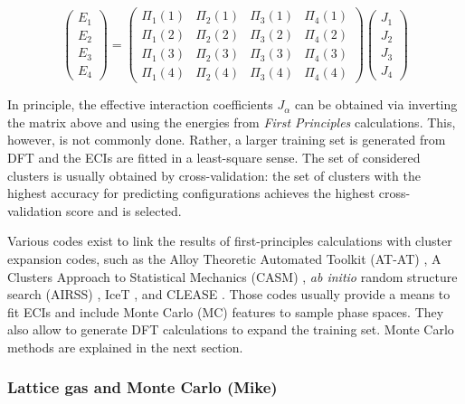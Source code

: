 \documentclass[../main.tex]{subfiles}
\begin{document}
\begin{equation}
{\left( \begin{array}{cccc}
{E_1}\\
{E_2}\\
{E_3}\\
{E_4}
\end{array}\right)}=
{\left( \begin{array}{cccc}
{\Pi_1}(1) & {\Pi_2}(1) & {\Pi_3}(1) & {\Pi_4}(1) \\
{\Pi_1}(2) & {\Pi_2}(2) & {\Pi_3}(2) & {\Pi_4}(2)  \\
{\Pi_1}(3) & {\Pi_2}(3) & {\Pi_3}(3) & {\Pi_4}(3)  \\
{\Pi_1}(4) & {\Pi_2}(4) & {\Pi_3}(4) & {\Pi_4}(4) 
\end{array}\right)}
{\left(\begin{array}{cccc}
{J_1}\\
{J_2}\\
{J_3}\\
{J_4}
\end{array}\right)}
\end{equation}

In principle, the effective interaction coefficients $J_\alpha$ can be obtained via inverting the matrix above and using the energies from \textit{First Principles} calculations. This, however, is not commonly done. Rather, a larger training set is generated from DFT and the ECIs are fitted in a least-square sense. The set of considered clusters is usually obtained by cross-validation: the set of clusters with the highest accuracy for predicting configurations achieves the highest cross-validation score and is selected.

Various codes exist to link the results of first-principles calculations with cluster expansion codes, such as the Alloy Theoretic Automated Toolkit (AT-AT) \cite{avdw:atat2,avdw:atat,VandeWalle2002},  A Clusters Approach to Statistical Mechanics (CASM) \cite{natarajan2017}, \textit{ab initio} random structure search (AIRSS) \cite{Pickard_2011}, IceT \cite{angvist2019}, and CLEASE \cite{chang2019}. Those codes usually provide a means to fit ECIs and include Monte Carlo (MC) features to sample phase spaces. They also allow to generate DFT calculations to expand the training set. Monte Carlo methods are explained in the next section.

\subsubsection{Lattice gas and Monte Carlo (Mike)}
\label{sec:monte_carlo}
\end{document}

